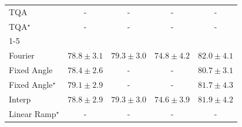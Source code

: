\begin{tabular}{l|cccc|}
TQA & {\cellcolor[HTML]{000000}} \color[HTML]{F1F1F1} {\cellcolor{white}} \color{black} - & {\cellcolor[HTML]{000000}} \color[HTML]{F1F1F1} {\cellcolor{white}} \color{black} - & {\cellcolor[HTML]{000000}} \color[HTML]{F1F1F1} {\cellcolor{white}} \color{black} - & {\cellcolor[HTML]{000000}} \color[HTML]{F1F1F1} {\cellcolor{white}} \color{black} - \\
TQA$^\star$ & {\cellcolor[HTML]{000000}} \color[HTML]{F1F1F1} {\cellcolor{white}} \color{black} - & {\cellcolor[HTML]{000000}} \color[HTML]{F1F1F1} {\cellcolor{white}} \color{black} - & {\cellcolor[HTML]{000000}} \color[HTML]{F1F1F1} {\cellcolor{white}} \color{black} - & {\cellcolor[HTML]{000000}} \color[HTML]{F1F1F1} {\cellcolor{white}} \color{black} - \\
\cline{1-5}
\multicolumn{5}{c}{\rule{0pt}{8pt}SV} \\
\midrule
Fourier & {\cellcolor[HTML]{157AB5}} \color[HTML]{F1F1F1} $78.8\pm 3.1$ & {\cellcolor[HTML]{056FAE}} \color[HTML]{F1F1F1} $79.3\pm 3.0$ & {\cellcolor[HTML]{B0C2DE}} \color[HTML]{000000} $74.8\pm 4.2$ & {\cellcolor[HTML]{023858}} \color[HTML]{F1F1F1} $82.0\pm 4.1$ \\
Fixed Angle & {\cellcolor[HTML]{2383BA}} \color[HTML]{F1F1F1} $78.4\pm 2.6$ & {\cellcolor[HTML]{000000}} \color[HTML]{F1F1F1} {\cellcolor{white}} \color{black} - & {\cellcolor[HTML]{000000}} \color[HTML]{F1F1F1} {\cellcolor{white}} \color{black} - & {\cellcolor[HTML]{04588A}} \color[HTML]{F1F1F1} $80.7\pm 3.1$ \\
Fixed Angle$^\star$ & {\cellcolor[HTML]{0A73B2}} \color[HTML]{F1F1F1} $79.1\pm 2.9$ & {\cellcolor[HTML]{000000}} \color[HTML]{F1F1F1} {\cellcolor{white}} \color{black} - & {\cellcolor[HTML]{000000}} \color[HTML]{F1F1F1} {\cellcolor{white}} \color{black} - & {\cellcolor[HTML]{023E62}} \color[HTML]{F1F1F1} $81.7\pm 4.3$ \\
Interp & {\cellcolor[HTML]{157AB5}} \color[HTML]{F1F1F1} $78.8\pm 2.9$ & {\cellcolor[HTML]{056FAE}} \color[HTML]{F1F1F1} $79.3\pm 3.0$ & {\cellcolor[HTML]{B7C5DF}} \color[HTML]{000000} $74.6\pm 3.9$ & {\cellcolor[HTML]{023A5B}} \color[HTML]{F1F1F1} $81.9\pm 4.2$ \\
Linear Ramp$^\star$ & {\cellcolor[HTML]{000000}} \color[HTML]{F1F1F1} {\cellcolor{white}} \color{black} - & {\cellcolor[HTML]{000000}} \color[HTML]{F1F1F1} {\cellcolor{white}} \color{black} - & {\cellcolor[HTML]{000000}} \color[HTML]{F1F1F1} {\cellcolor{white}} \color{black} - & {\cellcolor[HTML]{000000}} \color[HTML]{F1F1F1} {\cellcolor{white}} \color{black} - \\

\end{tabular}
